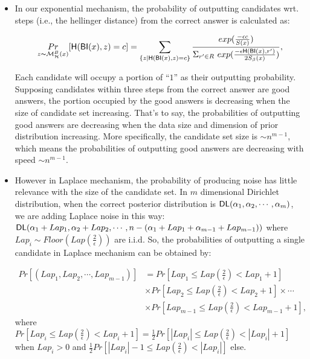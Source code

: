 \documentclass[sigconf, anonymous]{acmart}
\begin{document}
\begin{itemize}

	\item In our exponential mechanism, the probability of outputting candidates wrt. steps (i.e., the hellinger distance) from the correct answer is calculated as:

	\begin{equation*}
	\underset{z \thicksim \mathcal{M}^{B}_{\mathcal{H}}(x)}{Pr}[ \mathsf{H}(\mathsf{BI}(x), z) = c] = \sum\limits_{\{z| \mathsf{H}(\mathsf{BI}(x), z) = c\}}\frac{exp(\frac{- \epsilon c}{S(x)})}
	{\Sigma_{r' \in R}\ exp(\frac{-\epsilon \mathsf{H}(\mathsf{BI}(x),r')}{2 S_\beta(x)})},
	\end{equation*}

	Each candidate will occupy a portion of ``$1$'' as their outputting probability. Supposing candidates within three steps from the correct answer are good answers, the portion occupied by the good answers is decreasing when the size of candidate set increasing. That's to say, the probabilities of outputting good answers are decreasing when the data size and dimension of prior distribution increasing. More specifically, the candidate set size is $\sim n^{m-1}$, which means the probabilities of outputting good answers are decreasing with speed $\sim n^{m-1}$.

	\item However in Laplace mechanism, the probability of producing noise has little relevance with the size of the candidate set. In $m$ dimensional Dirichlet distribution, when the correct posterior distribution is $\mathsf{DL}(\alpha_1, \alpha_2, \cdots, \alpha_m)$, we are adding Laplace noise in this way: $\mathsf{DL}(\alpha_1 + Lap_1, \alpha_2 + Lap_2, \cdots, n - (\alpha_1 + Lap_1 + \alpha_{m-1} + Lap_{m-1}))$ where $Lap_i \sim Floor(Lap(\frac{2}{\epsilon}))$ are i.i.d. So, the probabilities of outputting a single candidate in Laplace mechanism can be obtained by: 

	\begin{equation*}
	\begin{split}
	Pr[(Lap_1, Lap_2, \cdots, Lap_{m-1})]  
	& = Pr[Lap_1 \leq Lap(\frac{2}{\epsilon}) < Lap_1 + 1] \\
	& \times Pr[Lap_2 \leq Lap(\frac{2}{\epsilon}) < Lap_2 + 1] \times \cdots \\
	& \times Pr[Lap_{m-1} \leq Lap(\frac{2}{\epsilon}) < Lap_{m-1} + 1],
	\end{split}
	\end{equation*}
	where $Pr[Lap_i \leq Lap(\frac{2}{\epsilon}) < Lap_i + 1] = \frac{1}{2} Pr[|Lap_i| \leq Lap(\frac{2}{\epsilon}) < |Lap_i| + 1]$ when $Lap_i > 0$ and $\frac{1}{2} Pr[|Lap_i| - 1 \leq Lap(\frac{2}{\epsilon}) < |Lap_i|]$ else.


\end{itemize}
\end{document}

